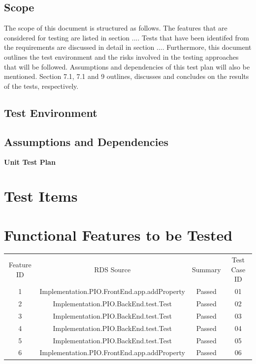 \documentclass[a4paper,12pt]{article}
\begin{document}
\subsection{Scope}
The scope of this document is structured as follows. The features that are considered for
testing are listed in section .... Tests that have been identifed from the requirements are
discussed in detail in section .... Furthermore, this document outlines the test environment
and the risks involved in the testing approaches that will be followed. Assumptions and
dependencies of this test plan will also be mentioned. Section 7.1, 7.1 and 9 outlines,
discusses and concludes on the results of the tests, respectively.
\subsection{Test Environment}
\subsection{Assumptions and Dependencies}

\newpage
\begin{center}
{\huge \bfseries Unit Test Plan}\\[0.5cm]
\end{center}
\section{Test Items}

\section{Functional Features to be Tested}
\begin{center}
 \begin{tabular}{||c| c| c| c||} 
 \hline
 Feature ID & RDS Source & Summary & Test Case ID \\ [0.5ex]
 1 & Implementation.PIO.FrontEnd.app.addProperty & Passed & 01 \\
 2 & Implementation.PIO.BackEnd.test.Test & Passed & 02 \\
 3 & Implementation.PIO.BackEnd.test.Test & Passed & 03 \\
 4 & Implementation.PIO.BackEnd.test.Test & Passed & 04 \\
 5 & Implementation.PIO.BackEnd.test.Test & Passed & 05 \\
 6 & Implementation.PIO.FrontEnd.app.addProperty & Passed & 06 \\



 \hline\hline
\end{tabular}
\end{center}
\end{document}
